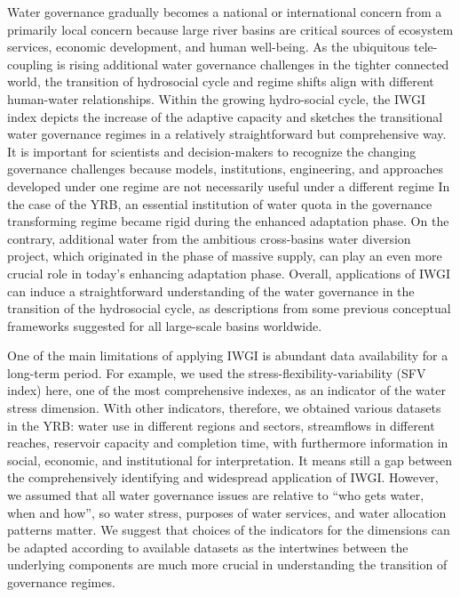 Water governance gradually becomes a national or international concern from a primarily local concern because large river basins are critical sources of ecosystem services, economic development, and human well-being.
As the ubiquitous tele-coupling is rising additional water governance challenges in the tighter connected world, the transition of hydrosocial cycle and regime shifts align with different human-water relationships.
Within the growing hydro-social cycle, the IWGI index depicts the increase of the adaptive capacity and sketches the transitional water governance regimes in a relatively straightforward but comprehensive way.
It is important for scientists and decision-makers to recognize the changing governance challenges because models, institutions, engineering, and approaches developed under one regime are not necessarily useful under a different regime
In the case of the YRB, an essential institution of water quota in the governance transforming regime became rigid during the enhanced adaptation phase.
On the contrary, additional water from the ambitious cross-basins water diversion project, which originated in the phase of massive supply, can play an even more crucial role in today's enhancing adaptation phase.
Overall, applications of IWGI can induce a straightforward understanding of the water governance in the transition of the hydrosocial cycle, as descriptions from some previous conceptual frameworks suggested for all large-scale basins worldwide.

One of the main limitations of applying IWGI is abundant data availability for a long-term period.
For example, we used the stress-flexibility-variability (SFV index) here, one of the most comprehensive indexes, as an indicator of the water stress dimension.
With other indicators, therefore, we obtained various datasets in the YRB: water use in different regions and sectors, streamflows in different reaches, reservoir capacity and completion time, with furthermore information in social, economic, and institutional for interpretation.
It means still a gap between the comprehensively identifying and widespread application of IWGI.
However, we assumed that all water governance issues are relative to ``who gets water, when and how'', so water stress, purposes of water services, and water allocation patterns matter.
We suggest that choices of the indicators for the dimensions can be adapted according to available datasets as the intertwines between the underlying components are much more crucial in understanding the transition of governance regimes.

